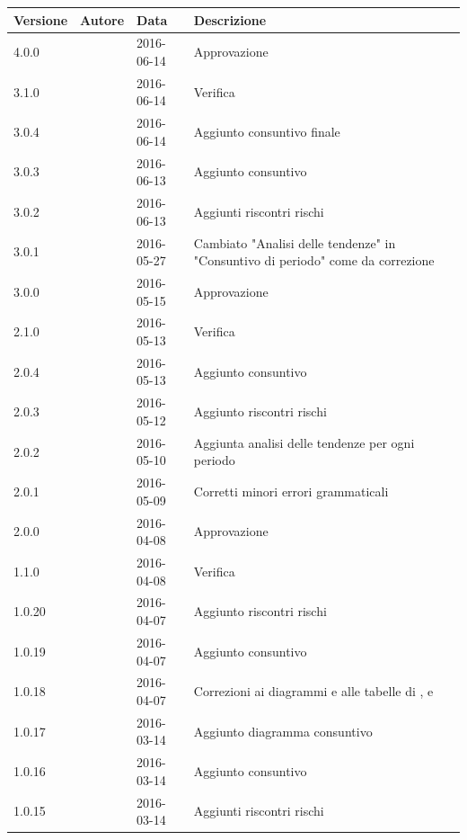 \documentclass[12pt,a4paper]{article}
\begin{document}
\begin{center}
	\begin{longtable}[H]{p{} p{} p{} p{}}
		\toprule
		\textbf{Versione} & \textbf{Autore} & \textbf{Data}	&	\textbf{Descrizione}\\*
		\midrule
		\midrule
		4.0.0 & \AVI{} & 2016-06-14 & Approvazione \\*
		\midrule
		3.1.0 & \NDC{} & 2016-06-14 & Verifica \\*
		\midrule
		3.0.4 & \TP{} & 2016-06-14 & Aggiunto consuntivo finale \\*
		\midrule
		3.0.3 & \TP{} & 2016-06-13 & Aggiunto consuntivo \FV \\*
		\midrule
		3.0.2 & \TP{} & 2016-06-13 & Aggiunti riscontri rischi \FV \\*
		\midrule
		3.0.1 & \TP{} & 2016-05-27 & Cambiato "Analisi delle tendenze" in "Consuntivo di periodo" come da correzione \\*
		\midrule
		3.0.0 & \AVE{} & 2016-05-15 & Approvazione \\*
		\midrule
		2.1.0 & \NDC{} & 2016-05-13 & Verifica \\*
		\midrule
		2.0.4 & \WS{} & 2016-05-13 & Aggiunto consuntivo \FC{} \\*
		\midrule
		2.0.3 & \AVE{} & 2016-05-12 & Aggiunto riscontri rischi \FC{} \\*
		\midrule
		2.0.2 & \AVE{} & 2016-05-10 & Aggiunta analisi delle tendenze per ogni periodo \\*
		\midrule
		2.0.1 & \WS{} & 2016-05-09 & Corretti minori errori grammaticali \\*
        \midrule
        2.0.0 & \TP{} & 2016-04-08 & Approvazione \\*
   		\midrule
   		1.1.0 & \NDC{} & 2016-04-08 & Verifica \\*
		\midrule
		1.0.20 & \TP{} & 2016-04-07 & Aggiunto riscontri rischi \FPD{} \\*
		\midrule
		1.0.19 & \TP{} & 2016-04-07 & Aggiunto consuntivo \FPD{} \\*
		\midrule
		1.0.18 & \TP{} & 2016-04-07 & Correzioni ai diagrammi e alle tabelle di \FAD, \FPA e \FPD{} \\*
		\midrule
		1.0.17 & \AB{} & 2016-03-14 & Aggiunto diagramma consuntivo \FPA \\*
        \midrule
	    1.0.16 & \AB{} & 2016-03-14 & Aggiunto consuntivo \FPA{} \\*
        \midrule
        1.0.15 & \AB{} & 2016-03-14 & Aggiunti riscontri rischi \FPA{} \\*

\end{longtable}
\end{center}
\end{document}
